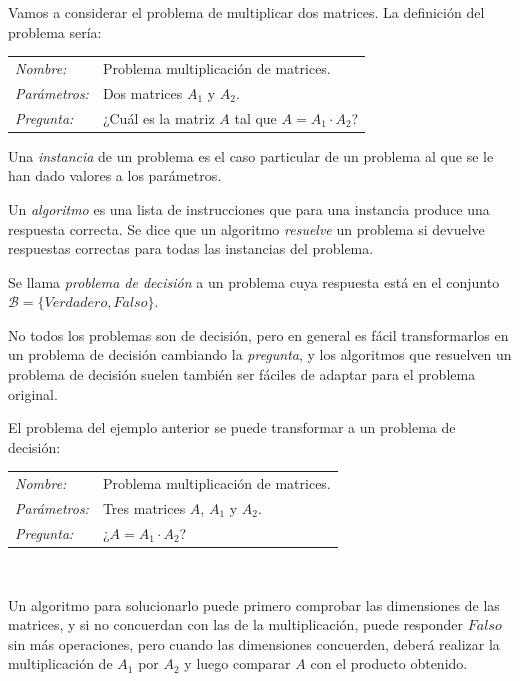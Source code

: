 \begin{example}
	Vamos a considerar el problema de multiplicar dos matrices. La definición del problema sería:
	
	\begin{tabular}{|ll}
		\textit{Nombre:} & Problema multiplicación de matrices. \\
		\textit{Parámetros:} & Dos matrices $A_1$ y $A_2$. \\
		\textit{Pregunta:} & ¿Cuál es la matriz $A$ tal que $A=A_1 \cdot A_2$? \\
	\end{tabular}
\end{example}

\begin{definition}
	Una \textit{instancia} de un problema es el caso particular de un problema al que se le han dado valores a los parámetros.
\end{definition}


\begin{definition}	
	Un \textit{algoritmo} es una lista de instrucciones que para una instancia produce una respuesta correcta. Se dice que un algoritmo \textit{resuelve} un problema si devuelve respuestas correctas para todas las instancias del problema.
\end{definition}


\begin{definition}
	Se llama \textit{problema de decisión} a un problema cuya respuesta está en el conjunto $\mathcal{B}= \{Verdadero, Falso\}$.
\end{definition}


No todos los problemas son de decisión, pero en general es fácil transformarlos en un problema de decisión cambiando la \textit{pregunta}, y los algoritmos que resuelven un problema de decisión suelen también ser fáciles de adaptar para el problema original.

\begin{example}
	El problema del ejemplo anterior se puede transformar a un problema de decisión:
	
	\begin{tabular}{|ll}
		\textit{Nombre:} & Problema multiplicación de matrices. \\
		\textit{Parámetros:} & Tres matrices $A$, $A_1$ y $A_2$. \\
		\textit{Pregunta:} & ¿$ A = A_1 \cdot A_2$? \\
	\end{tabular}
	\\
	\hfil
	
	Un algoritmo para solucionarlo puede primero comprobar las dimensiones de las matrices, y si no concuerdan con las de la multiplicación, puede responder $Falso$ sin más operaciones, pero cuando las dimensiones concuerden, deberá realizar la multiplicación de $A_1$ por $A_2$ y luego comparar $A$ con el producto obtenido.
	
\end{example}

